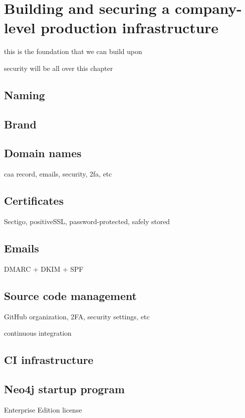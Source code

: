 \chapter{Building and securing a company-level production infrastructure}
\label{chapter:infrastructure}

this is the foundation that we can build upon

security will be all over this chapter

\section{Naming}

\section{Brand}

\section{Domain names}

caa record, emails, security, 2fa, etc

\section{Certificates}

Sectigo, positiveSSL, password-protected, safely stored

\section{Emails}

DMARC + DKIM + SPF

\section{Source code management}

GitHub organization, 2FA, security settings, etc

continuous integration

\section{CI infrastructure}

\section{Neo4j startup program}
Enterprise Edition license

